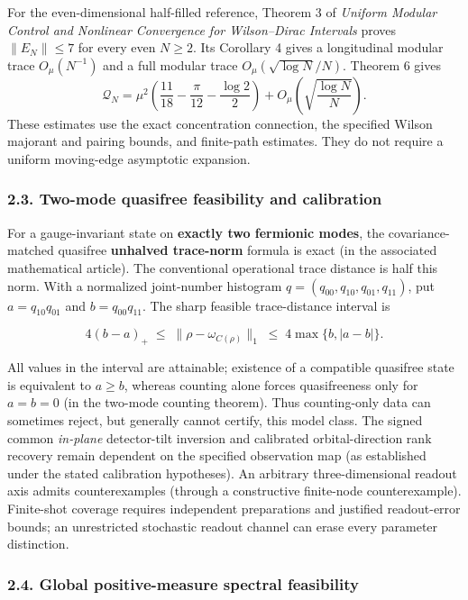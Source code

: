 \documentclass[
  10pt,
  a4paper,
]{article}
\begin{document}
For the even-dimensional half-filled reference, Theorem 3 of \emph{Uniform Modular Control and Nonlinear Convergence for Wilson--Dirac Intervals} proves \(\|E_N\|\le7\) for every even \(N\ge2\). Its Corollary 4 gives a longitudinal modular trace \(O_\mu(N^{-1})\) and a full modular trace \(O_\mu(\sqrt{\log N}/N)\). Theorem 6 gives \[\mathcal Q_N=\mu^2\left(\frac{11}{18}-\frac{\pi}{12}-\frac{\log2}{2}\right)+O_\mu\!\left(\sqrt{\frac{\log N}{N}}\right).\] These estimates use the exact concentration connection, the specified Wilson majorant and pairing bounds, and finite-path estimates. They do not require a uniform moving-edge asymptotic expansion.

\subsubsection{2.3. Two-mode quasifree feasibility and calibration}\label{two-mode-quasifree-feasibility-and-calibration}

For a gauge-invariant state on \textbf{exactly two fermionic modes}, the covariance-matched quasifree \textbf{unhalved trace-norm} formula is exact (in the associated mathematical article). The conventional operational trace distance is half this norm. With a normalized joint-number histogram \(q=(q_{00},q_{10},q_{01},q_{11})\), put \(a=q_{10}q_{01}\) and \(b=q_{00}q_{11}\). The sharp feasible trace-distance interval is

\[
\boxed{4(b-a)_+\;\le\;\|\rho-\omega_{C(\rho)}\|_1
\;\le\;4\max\{b,|a-b|\}.}
\]

All values in the interval are attainable; existence of a compatible quasifree state is equivalent to \(a\ge b\), whereas counting alone forces quasifreeness only for \(a=b=0\) (in the two-mode counting theorem). Thus counting-only data can sometimes reject, but generally cannot certify, this model class. The signed common \emph{in-plane} detector-tilt inversion and calibrated orbital-direction rank recovery remain dependent on the specified observation map (as established under the stated calibration hypotheses). An arbitrary three-dimensional readout axis admits counterexamples (through a constructive finite-node counterexample). Finite-shot coverage requires independent preparations and justified readout-error bounds; an unrestricted stochastic readout channel can erase every parameter distinction.

\subsubsection{2.4. Global positive-measure spectral feasibility}\label{global-positive-measure-spectral-feasibility}
\end{document}
